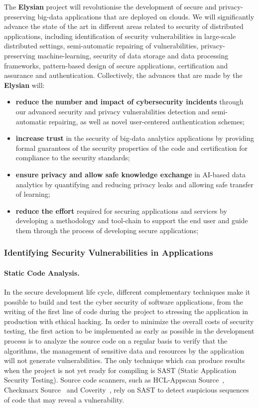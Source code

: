 \documentclass[a4paper,11pt]{article}
\newcommand{\project}[1]{\textbf{#1}\xspace}
\newcommand{\SECURITY}{\project{Elysian}}
\newcommand{\TheProject}{\SECURITY}
\begin{document}
The \TheProject{} project will revolutionise the development of secure and privacy-preserving big-data applications that are deployed on clouds. We will significantly advance the state of the art in different areas related to security of distributed applications, including identification of security vulnerabilities in large-scale distributed settings, semi-automatic repairing of vulnerabilities, privacy-preserving machine-learning, security of data storage and data processing frameworks, pattern-based design of secure applications, certification and assurance and authentication. Collectively, the advances that are made by the \TheProject{} will:
\begin{itemize}
\item \textbf{reduce the number and impact of cybersecurity incidents} through our advanced security and privacy vulnerabilities detection and semi-automatic repairing, as well as novel user-centered authentication schemes;
\item \textbf{increase trust} in the security of big-data analytics applications by providing formal guarantees of the security properties of the code and certification for compliance to the security standards;
\item \textbf{ensure privacy and allow safe knowledge exchange} in AI-based data analytics by quantifying and reducing privacy leaks and allowing safe transfer of learning;
\item \textbf{reduce the effort} required for securing applications and services by developing a methodology and tool-chain to support the end user and guide them through the process of developing secure applications;

\end{itemize}

\subsubsection{Identifying Security Vulnerabilities in Applications}
\label{sect:background-first}
\label{sect:identifying}

\paragraph{Static Code Analysis.}
In the secure development life cycle, different complementary techniques make it possible to build and test the cyber security of software applications, from the writing of the first line of code during the project to stressing the application in production with ethical hacking. In order to minimize the overall costs of security testing, the first action to be implemented as early as possible in the development process is to analyze the source code on a regular basis to verify that the algorithms, the management of sensitive data and resources by the application will not generate vulnerabilities. The only technique which can produce results when the project is not yet ready for compiling is SAST (Static Application Security Testing). Source code scanners, such as HCL-Appscan Source~\cite{AppScan}, Checkmarx Source~\cite{Checkmarx} and Coverity~\cite{Coverity}, rely on SAST to detect suspicious sequences of code that may reveal a vulnerability. 
\end{document}
